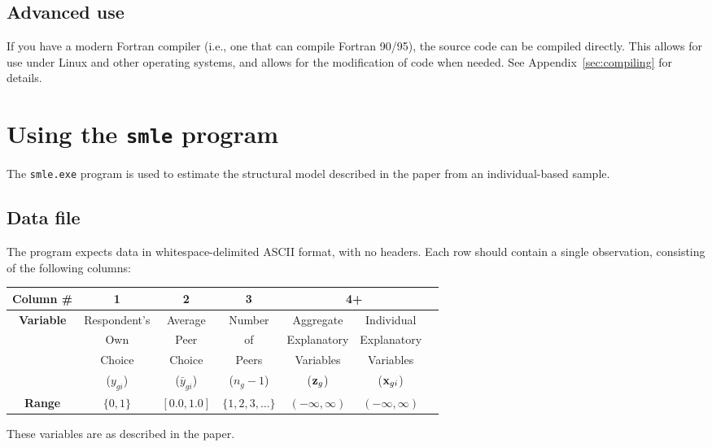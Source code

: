 \documentclass{article}
\begin{document}
\subsection{Advanced use}

If you have a modern Fortran compiler (i.e., one that can compile Fortran 90/95), 
the source code can be compiled directly.  This allows for use under Linux and other 
operating systems, and allows for the modification of code when needed.  
See Appendix~\ref{sec:compiling} for details.

\section{Using the {\tt smle} program }\label{sec:smle}

The {\tt smle.exe} program is used to estimate the structural model 
described in the paper from an individual-based sample.  

\subsection{Data file}

The program expects data in whitespace-delimited ASCII format, with
no headers.  Each row should contain a single observation,
consisting of the following columns:
\begin{center}
\begin{tabular}{|c|c|c|c|c|c p{0in}|}
\hline
{\footnotesize {\bf Column \# }} & {\footnotesize 1} & {\footnotesize 2} & {\footnotesize 3} & \multicolumn{2}{c}{\footnotesize 4+}  & \\ 
\hline
{\footnotesize {\bf Variable }} & {\footnotesize Respondent's} & {\footnotesize Average} & {\footnotesize Number} & {\footnotesize Aggregate} & {\footnotesize Individual}  & \\
                & {\footnotesize Own}       & {\footnotesize Peer}    & {\footnotesize of}     & {\footnotesize Explanatory}  & {\footnotesize Explanatory} & \\
				        & {\footnotesize Choice}  & {\footnotesize Choice}  & {\footnotesize Peers}  & {\footnotesize Variables} & {\footnotesize Variables} & \\
 & ($y_{gi}$) & ($\bar{y}_{gi}$) & ($n_g-1$) & (${\bf z}_g$) & (${\bf x}_{gi}$) & \\
\hline
{\footnotesize {\bf Range }} & {\footnotesize $\{0,1\}$} & {\footnotesize $[0.0,1.0]$} & {\footnotesize $\{1,2,3,\ldots\}$} & {\footnotesize $(-\infty,\infty)$} & {\footnotesize $(-\infty,\infty)$} & \\
\hline
\end{tabular}
\end{center}
These variables are as described in the paper.
\end{document}
